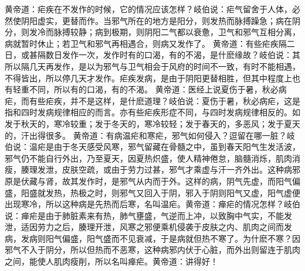 \documentclass[a4paper,12pt,UTF8,twoside]{ctexbook}
\begin{document}
黄帝道：疟疾在不发作的时候，它的情况应该怎样？岐伯说：疟气留舍于人体，必然使阴阳虚实，更替而作。当邪气所在的地方是阳分，则发热而脉搏躁急；病在阴分，则发冷而脉搏较静；病到极期，则阴阳二气都以衰惫，卫气和邪气互相分离，病就暂时休止；若卫气和邪气再相遇合，则病又发作了。
黄帝道：有些疟疾隔二日，或甚隔数日发作一次，发作时有的口渴，有的不渴，是什麽缘故？岐伯说：其所以隔几天再发作，是以为邪气与卫气相会于风府的时间不一致，有时不能相遇，不得皆出，所以停几天才发作。疟疾发病，是由于阴阳更替相胜，但其中程度上也有轻重不同，所以有的口渴，有的不渴。
黄帝道：医经上说夏伤于暑，秋必病疟，而有些疟疾，并不是这样，是什麽道理？岐伯说：夏伤于暑，秋必病疟，这是指和四时发病规律相应的而言。亦有些疟疾形症不同，与四时发病规律相反的。如发于秋天的，寒冷较重；发于冬天的，寒冷较轻；发于春天的，多恶风；发于夏天的，汗出得很多。
黄帝道：有病温疟和寒疟，邪气如何侵入？逗留在哪一脏？岐伯说：温疟是由于冬天感受风寒，邪气留藏在骨髓之中，虽到春天阳气生发活波，邪气仍不能自行外出，乃至夏天，因夏热炽盛，使人精神倦怠，脑髓消烁，肌肉消瘦，腠理发泄，皮肤空疏，或由于劳力过甚，邪气才乘虚与汗一齐外出。这种病邪原是伏藏与肾，故其发作时，是邪气从内而于外。这样的病，阴气先虚，而阳气偏盛，阳盛就发热，热极之时，则邪气又回入于阴，邪入于阴则阳气又虚，阳气虚便出现寒冷，所以这种病是先热而后寒，名叫温疟。黄帝道：瘅疟的情况怎样？岐伯说：瘅疟是由于肺脏素来有热，肺气壅盛，气逆而上冲，以致胸中气实，不能发泄，适因劳力之后，腠理开泄，风寒之邪便乘机侵袭于皮肤之内、肌肉之间而发病，发病则阳气偏盛，阳气盛而不见衰减，于是病就但热不寒了。为什麽不寒？因邪气不入于阴分，所以但热而不恶寒，这种病邪内伏于心脏，而外出则留连于肌肉之间，能使人肌肉瘦削，所以名叫瘅疟。黄帝道：讲得好！
\end{document}
